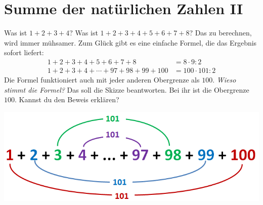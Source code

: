 \documentclass{../../zirkelblatt}
\begin{document}
\section*{Summe der natürlichen Zahlen II}
Was ist $1 + 2 + 3 + 4$? Was ist $1 + 2 + 3 + 4 + 5 + 6 + 7 + 8$? Das zu
berechnen, wird immer mühsamer. Zum Glück gibt es eine einfache Formel, die das
Ergebnis sofort liefert:
\begin{align*}
  1 + 2 + 3 + 4 + 5 + 6 + 7 + 8 &= 8 \cdot 9 : 2 \\
  1 + 2 + 3 + 4 + \cdots + 97 + 98 + 99 + 100 &= 100 \cdot 101 : 2
\end{align*}
Die Formel funktioniert auch mit jeder anderen Obergrenze als $100$. \emph{Wieso
stimmt die Formel?} Das soll die Skizze beantworten. Bei ihr ist die
Obergrenze~$100$. Kannst du den Beweis erklären?
\begin{center}
\includegraphics[scale=0.7]{kleiner-gauss-2}
\end{center}


\vfill
\end{document}
